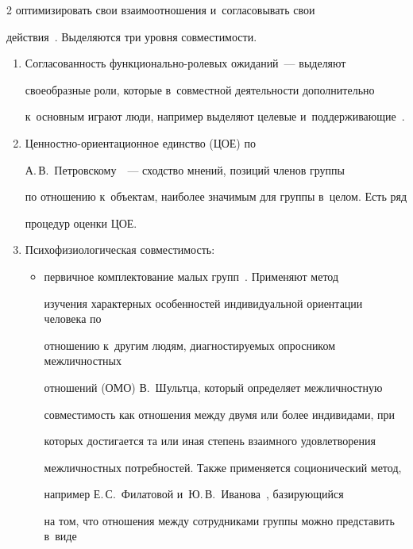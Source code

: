 \begin{multicols}{2}
оптимизировать свои взаимоотношения и~согласовывать свои 

действия~\cite{15-r}. Выделяются три уровня со\-вмес\-ти\-мости.\\[-14pt]

  \begin{enumerate}[1.]

\item Согласованность функ\-ци\-о\-наль\-но-ро\-ле\-вых ожи\-да\-ний~--- выделяют 

своеобразные роли, которые в~совместной дея\-тель\-ности дополнительно 

к~основным играют люди, например выделяют целевые и~под\-дер\-жи\-ва\-ющие~\cite{16-r}.\\[-14pt]

\item Ценностно-ори\-ен\-та\-ци\-он\-ное единст\-во (ЦОЕ) по 

А.\,В.~Петровскому~\cite{17-r}~--- сход\-ст\-во мнений, позиций членов группы 

по отношению к~объектам, наиболее значимым для группы в~целом. Есть ряд 

процедур оценки ЦОЕ.\\[-14pt]

\item Психофизиологическая со\-вмес\-ти\-мость:\\[-14pt]

\begin{itemize}

\item первичное комплектование малых групп~\cite{18-r}. Применяют метод 

изуче\-ния характерных особенностей индивидуальной ориентации человека по 

отношению к~другим людям, диагностируемых опросником межличностных 

отношений (ОМО) В.~Шультца, который определяет межличностную 

со\-вмес\-ти\-мость как отношения между двумя или более индивидами, при 

которых достигается та или иная степень взаимного удовле\-тво\-ре\-ния 

меж\-лич\-ност\-ных по\-треб\-но\-стей. Так\-же применяется соционический метод, 

например Е.\,С.~Филатовой и~Ю.\,В.~Иванова~\cite{19-r, 20-r}, ба\-зи\-ру\-ющий\-ся 

на том, что отношения между сотрудниками группы можно пред\-ста\-вить в~виде 


\end{itemize}
\end{enumerate}
\end{multicols}
